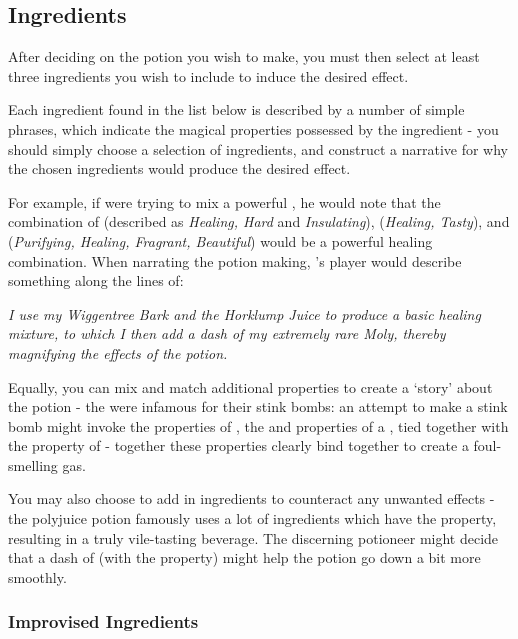 \subsection{Ingredients}

After deciding on the potion you wish to make, you must then select at least three ingredients you wish to include to induce the desired effect. 

Each ingredient found in the list below is described by a number of simple phrases, which indicate the magical properties possessed by the ingredient - you should simply choose a selection of ingredients, and construct a narrative for why the chosen ingredients would produce the desired effect. 

For example, if  were trying to mix a powerful , he would note that the combination of  (described as {\it Healing, Hard} and {\it Insulating}),  ({\it Healing, Tasty}), and  ({\it Purifying, Healing, Fragrant, Beautiful}) would be a powerful healing combination. When narrating the potion making, 's player would describe something along the lines of:

{\it I use my Wiggentree Bark and the Horklump Juice to produce a basic healing mixture, to which I then add a dash of my extremely rare Moly, thereby magnifying the effects of the potion.}

Equally, you can mix and match additional properties to create a `story' about the potion - the  were infamous for their stink bombs: an attempt to make a stink bomb might invoke the  properties of , the  and  properties of a , tied together with the  property of  - together these properties clearly bind together to create a foul-smelling gas. 

You may also choose to add in ingredients to counteract any unwanted effects - the polyjuice potion famously uses a lot of ingredients which have the  property, resulting in a truly vile-tasting beverage. The discerning potioneer might decide that a dash of  (with the  property) might help the potion go down a bit more smoothly. 



\subsubsection{Improvised Ingredients}

